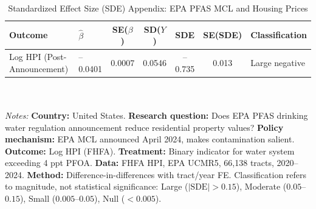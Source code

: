 \begin{table}[h]
\centering
\caption{Standardized Effect Size (SDE) Appendix: EPA PFAS MCL and Housing Prices}
\label{table:sde}
\small
\begin{tabular}{llccccl}
\toprule
Outcome & $\hat{\beta}$ & SE($\beta$) & SD($Y$) & SDE & SE(SDE) & Classification \\
\midrule
Log HPI (Post-Announcement) & --0.0401 & 0.0007 & 0.0546 & --0.735 & 0.013 & Large negative \\
\bottomrule
\end{tabular}
\\ \\
\small \textit{Notes:} \textbf{Country:} United States. \textbf{Research question:} Does EPA PFAS drinking water regulation announcement reduce residential property values? \textbf{Policy mechanism:} EPA MCL announced April 2024, makes contamination salient. \textbf{Outcome:} Log HPI (FHFA). \textbf{Treatment:} Binary indicator for water system exceeding 4 ppt PFOA. \textbf{Data:} FHFA HPI, EPA UCMR5, 66,138 tracts, 2020--2024. \textbf{Method:} Difference-in-differences with tract/year FE. Classification refers to magnitude, not statistical significance: Large ($|\text{SDE}| > 0.15$), Moderate ($0.05$--$0.15$), Small ($0.005$--$0.05$), Null ($< 0.005$).
\end{table}
